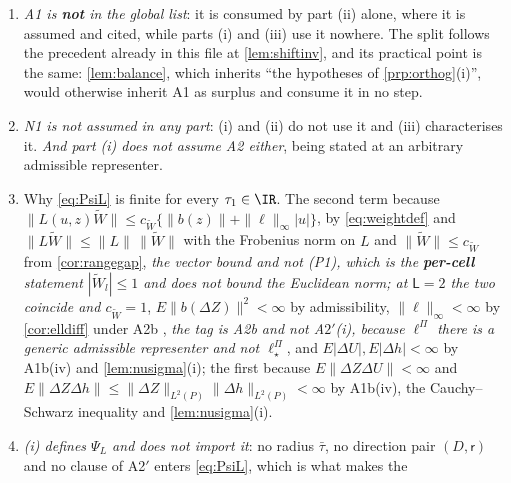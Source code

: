 \begin{remark}\label{rem:orthoghyp}
\begin{enumerate}
\item[(1)] \emph{A1 is \textbf{not} in the global list}: it is consumed by part (ii) alone, where it
is assumed and cited, while parts (i) and (iii) use it nowhere. The split follows the precedent
already in this file at \cref{lem:shiftinv}, and its practical point is the same: \cref{lem:balance},
which inherits ``the hypotheses of \cref{prp:orthog}(i)'', would otherwise inherit A1 as surplus and
consume it in no step.
\item[(2)] \emph{N1 is not assumed in any part}: (i) and (ii) do not use it and (iii) characterises it.
\emph{And part (i) does not assume A2 either}, being stated at an arbitrary admissible representer.
\item[(3)] Why \eqref{eq:PsiL} is finite for every $\tau_1\in\IR$. The second term because
$\|L(u,z)\widetilde W\|\le c_{\widetilde W}\{\|b(z)\|+\|\ell\|_\infty|u|\}$, by
\eqref{eq:weightdef} and $\|L\widetilde W\|\le\|L\|\,\|\widetilde W\|$ with the Frobenius norm on $L$ and
$\|\widetilde W\|\le c_{\widetilde W}$ from \cref{cor:rangegap}, \emph{the vector bound and
not \textup{(P1)}, which is the \textbf{per-cell} statement $|\widetilde W_l|\le1$ and does not bound the
Euclidean norm; at $\mathsf L=2$ the two coincide and $c_{\widetilde W}=1$}, 
$E\|b(\Delta Z)\|^{2}<\infty$ by admissibility, $\|\ell\|_\infty<\infty$ by \cref{cor:elldiff} under A2b
, \emph{the tag is A2b and not A$2'$(i), because $\ell^\Pi$ there is a generic admissible representer
and not $\ell^\Pi_\star$}, and $E|\Delta U|,E|\Delta h|<\infty$ by A1b(iv) and \cref{lem:nusigma}(i);
the first because $E\|\Delta Z\Delta U\|<\infty$ and
$E\|\Delta Z\Delta h\|\le\|\Delta Z\|_{L^{2}(P)}\|\Delta h\|_{L^{2}(P)}<\infty$ by A1b(iv), the
Cauchy--Schwarz inequality and \cref{lem:nusigma}(i).
\item[(4)] \emph{(i) defines $\Psi_L$ and does not import it}: no radius $\bar\tau$, no
direction pair $(D,\mathsf r)$ and no clause of A2$'$ enters \eqref{eq:PsiL}, which is what makes the

\end{enumerate}
\end{remark}
